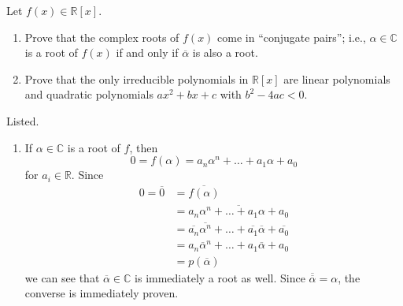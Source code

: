   \begin{exercise}[Shifrin 3.2.7]
    Let $f(x) \in \mathbb{R}[x]$.
    \begin{enumerate}
      \item Prove that the complex roots of $f(x)$ come in ``conjugate pairs''; i.e., $\alpha \in \mathbb{C}$ is a root of $f(x)$ if and only if $\overline{\alpha}$ is also a root.
      \item Prove that the only irreducible polynomials in $\mathbb{R}[x]$ are linear polynomials and quadratic polynomials $ax^2 + bx + c$ with $b^2 - 4ac < 0$.
    \end{enumerate}
  \end{exercise}
  \begin{solution}
    Listed. 
    \begin{enumerate}
      \item If $\alpha \in \mathbb{C}$ is a root of $f$, then 
      \begin{equation}
        0 = f(\alpha) = a_n \alpha^n + \ldots + a_1 \alpha + a_0
      \end{equation}
      for $a_i \in \mathbb{R}$. Since 
      \begin{align}
        0 = \overline{0} & = \overline{f(\alpha)} \\
                         & = \overline{a_n \alpha^n + \ldots + a_1 \alpha + a_0} \\
                         & = \overline{a_n} \overline{\alpha^n} + \ldots + \overline{a_1} \overline{\alpha} + \overline{a_0} \\
                         & = a_n \overline{\alpha}^n + \ldots + a_1 \overline{\alpha} + a_0 \\
                         & = p(\overline{\alpha})
      \end{align} 
      we can see that $\overline{\alpha} \in \mathbb{C}$ is immediately a root as well. Since $\overline{\overline{\alpha}} = \alpha$, the converse is immediately proven. 


\end{enumerate}
\end{solution}
